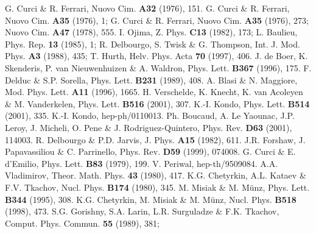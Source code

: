 \documentclass[a4paper,11pt]{article}
\begin{document}
\begin{thebibliography}{99} 
 G. Curci \& R. Ferrari, Nuovo Cim. {\bf A32} (1976), 151. 
 G. Curci \& R. Ferrari, Nuovo Cim. {\bf A35} (1976), 1; 
G. Curci \& R. Ferrari, Nuovo Cim. {\bf A35} (1976), 273; 
Nuovo Cim. {\bf A47} (1978), 555. 
 I. Ojima, Z. Phys. {\bf C13} (1982), 173; 
L. Baulieu, Phys. Rep. {\bf 13} (1985), 1; 
R. Delbourgo, S. Twisk \& G. Thompson, Int. J. Mod. Phys. {\bf A3} (1988), 435;
T. Hurth, Helv. Phys. Acta {\bf 70} (1997), 406. 
 J. de Boer, K. Skenderis, P. van Nieuwenhuizen \& A. Waldron, Phys.
Lett. {\bf B367} (1996), 175. 
 F. Delduc \& S.P. Sorella, Phys. Lett. {\bf B231} (1989), 408. 
 A. Blasi \& N. Maggiore, Mod. Phys. Lett. {\bf A11} (1996), 1665. 
 H. Verschelde, K. Knecht, K. van Acoleyen \& M. Vanderkelen, 
Phys. Lett. {\bf B516} (2001), 307. 
 K.-I. Kondo, Phys. Lett. {\bf B514} (2001), 335.  
 K.-I. Kondo, hep-ph/0110013. 
 Ph. Boucaud, A. Le Yaounac, J.P. Leroy, J. Micheli, O. Pene \&
J. Rodriguez-Quintero, Phys. Rev. {\bf D63} (2001), 114003. 
 R. Delbourgo \& P.D. Jarvis, J. Phys. {\bf A15} (1982), 611.
 J.R. Forshaw, J. Papavassiliou \& C. Parrinello, Phys. Rev. {\bf
D59} (1999), 074008. 
 G. Curci \& E. d'Emilio, Phys. Lett. {\bf B83} (1979), 199. 
 V. Periwal, hep-th/9509084. 
 A.A. Vladimirov, Theor. Math. Phys. {\bf 43} (1980), 417.
 K.G. Chetyrkin, A.L. Kataev \& F.V. Tkachov, Nucl. Phys. {\bf 
B174} (1980), 345.
 M. Misiak \& M. M\"{u}nz, Phys. Lett. {\bf B344} (1995), 308.
 K.G. Chetyrkin, M. Misiak \& M. M\"{u}nz, Nucl. Phys. {\bf B518} 
(1998), 473.
 S.G. Gorishny, S.A. Larin, L.R. Surguladze \& F.K. Tkachov, 
Comput. Phys. Commun. {\bf 55} (1989), 381;  

\end{thebibliography}
\end{document}

